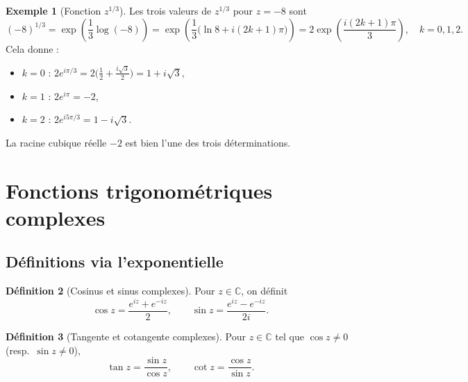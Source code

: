 \documentclass[12pt,a4paper,openany]{book}
\theoremstyle{definition}
\newtheorem{definition}{Définition}[chapter]
\newtheorem{exemple}[definition]{Exemple}
\theoremstyle{plain}
\theoremstyle{remark}
\newcommand{\C}{\mathbb{C}}
\begin{document}
\begin{exemple}[Fonction $z^{1/3}$]\label{ex:racine-cubique}
Les trois valeurs de $z^{1/3}$ pour $z = -8$ sont
\[
  (-8)^{1/3} = \exp\!\left(\frac{1}{3}\log(-8)\right)
             = \exp\!\left(\frac{1}{3}\bigl(\ln 8 + i(2k+1)\pi\bigr)\right)
             = 2\exp\!\left(\frac{i(2k+1)\pi}{3}\right), \quad k = 0, 1, 2.
\]
Cela donne :
\begin{itemize}
  \item $k=0$ : $2e^{i\pi/3} = 2\bigl(\frac{1}{2} + \frac{i\sqrt{3}}{2}\bigr) = 1 + i\sqrt{3}$,
  \item $k=1$ : $2e^{i\pi} = -2$,
  \item $k=2$ : $2e^{i5\pi/3} = 1 - i\sqrt{3}$.
\end{itemize}
La racine cubique réelle $-2$ est bien l'une des trois déterminations.
\end{exemple}

\section{Fonctions trigonométriques complexes}\label{sec:trig}

\subsection{Définitions via l'exponentielle}

\begin{definition}[Cosinus et sinus complexes]\label{def:cos-sin-complexes}
Pour $z \in \C$, on définit
\[
  \cos z = \frac{e^{iz} + e^{-iz}}{2}, \qquad
  \sin z = \frac{e^{iz} - e^{-iz}}{2i}.
\]
\end{definition}

\begin{definition}[Tangente et cotangente complexes]\label{def:tan-cot-complexes}
Pour $z \in \C$ tel que $\cos z \neq 0$ (resp.\ $\sin z \neq 0$),
\[
  \tan z = \frac{\sin z}{\cos z}, \qquad
  \cot z = \frac{\cos z}{\sin z}.
\]
\end{definition}
\end{document}
